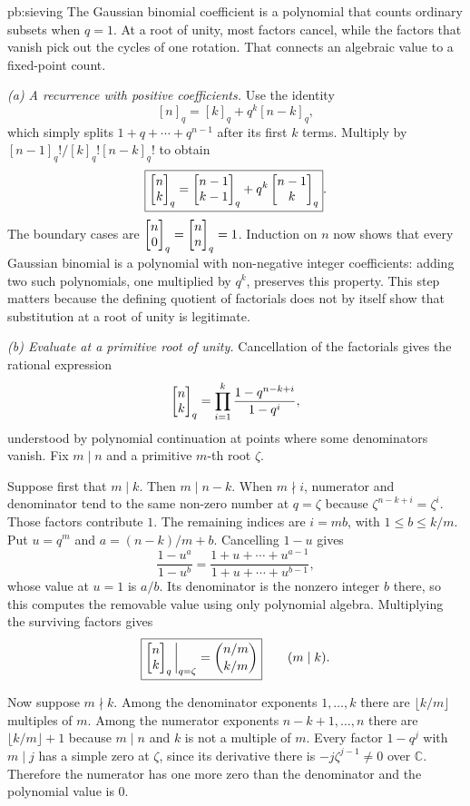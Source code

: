 \begin{solution}{pb:sieving}
\idea The Gaussian binomial coefficient is a polynomial that counts ordinary subsets when $q=1$. At a root of unity, most factors cancel, while the factors that vanish pick out the cycles of one rotation. That connects an algebraic value to a fixed-point count.

\writeup \emph{(a) A recurrence with positive coefficients.}
Use the identity
\[
[n]_q=[k]_q+q^k[n-k]_q,
\]
which simply splits $1+q+\cdots+q^{n-1}$ after its first $k$ terms. Multiply by $[n-1]_q!/[k]_q![n-k]_q!$ to obtain
\[
\boxed{\begin{bmatrix}n\\k\end{bmatrix}_q=\begin{bmatrix}n-1\\k-1\end{bmatrix}_q
 +q^k\begin{bmatrix}n-1\\k\end{bmatrix}_q}.
\]
The boundary cases are $\begin{bmatrix}n\\0\end{bmatrix}_q=\begin{bmatrix}n\\n\end{bmatrix}_q=1$. Induction on $n$ now shows that every Gaussian binomial is a polynomial with non-negative integer coefficients: adding two such polynomials, one multiplied by $q^k$, preserves this property. This step matters because the defining quotient of factorials does not by itself show that substitution at a root of unity is legitimate.

\emph{(b) Evaluate at a primitive root of unity.}
Cancellation of the factorials gives the rational expression
\[
\begin{bmatrix}n\\k\end{bmatrix}_q=\prod_{i=1}^k
\frac{1-q^{n-k+i}}{1-q^i},
\]
understood by polynomial continuation at points where some denominators vanish. Fix $m\mid n$ and a primitive $m$-th root $\zeta$.

Suppose first that $m\mid k$. Then $m\mid n-k$. When $m\nmid i$, numerator and denominator tend to the same non-zero number at $q=\zeta$ because $\zeta^{n-k+i}=\zeta^i$. Those factors contribute $1$. The remaining indices are $i=mb$, with $1\le b\le k/m$. Put $u=q^m$ and $a=(n-k)/m+b$. Cancelling $1-u$ gives
\[
\frac{1-u^a}{1-u^b}
=\frac{1+u+\cdots+u^{a-1}}{1+u+\cdots+u^{b-1}},
\]
whose value at $u=1$ is $a/b$. Its denominator is the nonzero integer $b$ there, so this computes the removable value using only polynomial algebra.
Multiplying the surviving factors gives
\[
\boxed{\begin{bmatrix}n\\k\end{bmatrix}_q\bigg|_{q=\zeta}
=\binom{n/m}{k/m}}\qquad(m\mid k).
\]

Now suppose $m\nmid k$. Among the denominator exponents $1,\ldots,k$ there are $\lfloor k/m\rfloor$ multiples of $m$. Among the numerator exponents $n-k+1,\ldots,n$ there are $\lfloor k/m\rfloor+1$ because $m\mid n$ and $k$ is not a multiple of $m$. Every factor $1-q^j$ with $m\mid j$ has a simple zero at $\zeta$, since its derivative there is $-j\zeta^{j-1}\ne0$ over $\mathbb C$. Therefore the numerator has one more zero than the denominator and the polynomial value is $0$.


\end{solution}
